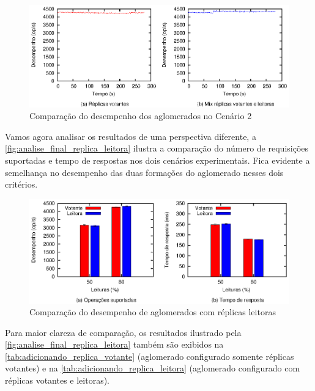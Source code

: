 \begin{figure}[ht]
  \centering
  \includegraphics[width=14cm]{conteudo/capitulos/figuras/final-replica-leitora-pr80.eps}
  \caption{Comparação do desempenho dos aglomerados no Cenário 2}
  \label{fig:replica_leitora_cenario2}
\end{figure}

Vamos agora analisar os resultados de uma perspectiva diferente, a
\autoref{fig:analise_final_replica_leitora} ilustra a comparação do número de requisições
suportadas e tempo de respostas nos dois cenários experimentais. Fica evidente a
semelhança no desempenho das duas formações do aglomerado nesses dois critérios.

\begin{figure}[ht]
  \centering
  \includegraphics[width=14cm]{conteudo/capitulos/figuras/final-replica-leitora.eps}
  \caption{Comparação do desempenho de aglomerados com réplicas leitoras}
  \label{fig:analise_final_replica_leitora}
\end{figure}

Para maior clareza de comparação, os resultados ilustrado pela
\autoref{fig:analise_final_replica_leitora} também são exibidos na
\autoref{tab:adicionando_replica_votante} (aglomerado configurado somente réplicas
votantes) e na \autoref{tab:adicionando_replica_leitora} (aglomerado configurado com
réplicas votantes e leitoras).

\begin{table}[htb]
\end{table}

